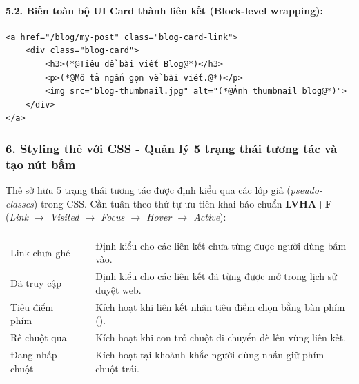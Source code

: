 \paragraph{5.2. Biến toàn bộ UI Card thành liên kết (Block-level wrapping):}
\begin{codeWindow}
\begin{lstlisting}[language=HTML5]
<a href="/blog/my-post" class="blog-card-link">
    <div class="blog-card">
        <h3>(*@Tiêu đề bài viết Blog@*)</h3>
        <p>(*@Mô tả ngắn gọn về bài viết.@*)</p>
        <img src="blog-thumbnail.jpg" alt="(*@Ảnh thumbnail blog@*)">
    </div>
</a>
\end{lstlisting}
\end{codeWindow}

\subsubsection{6. Styling thẻ  với CSS - Quản lý 5 trạng thái tương tác và tạo nút bấm}

Thẻ  sở hữu 5 trạng thái tương tác được định kiểu qua các lớp giả (\textit{pseudo-classes}) trong CSS. Cần tuân theo thứ tự ưu tiên khai báo chuẩn \textbf{LVHA+F} (\textit{Link $\rightarrow$ Visited $\rightarrow$ Focus $\rightarrow$ Hover $\rightarrow$ Active}):

\begin{prettyTableBox}
\begin{tabularx}{\linewidth}{C{2.5cm} L{3.5cm} Z}
 &  &  \\
Link chưa ghé &  & Định kiểu cho các liên kết chưa từng được người dùng bấm vào. \\
Đã truy cập &  & Định kiểu cho các liên kết đã từng được mở trong lịch sử duyệt web. \\
Tiêu điểm phím &  & Kích hoạt khi liên kết nhận tiêu điểm chọn bằng bàn phím (). \\
Rê chuột qua &  & Kích hoạt khi con trỏ chuột di chuyển đè lên vùng liên kết. \\
Đang nhấp chuột &  & Kích hoạt tại khoảnh khắc người dùng nhấn giữ phím chuột trái. \\
\end{tabularx}
\end{prettyTableBox}

